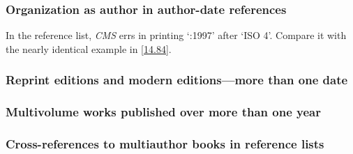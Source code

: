 \documentclass[11pt,letterpaper,oneside]{article}
\begin{document}
\begin{citeref}
\item \parencite{silverstein1974}
\item \parencite{soltes1999}
\end{citeref}

\subsubsection{Organization as author in author-date references}

In the reference list, \textit{CMS} errs in printing `:1997' after
`ISO 4'. Compare it with the nearly identical example in \ref{14.84}.

\begin{citeref}
\item \parencite{iso1997.ref}
\end{citeref}

\setcounter{subsubsection}{39}
\subsubsection{Reprint editions and modern editions—more than one date}

\begin{citeref}
\item \parencite{austen2003}
\item \parencite{maitland1998}
\end{citeref}

\subsubsection{Multivolume works published over more than one year}

\begin{citeref}
\item \parencite[1:133]{tillich1951}
\end{citeref}

\subsubsection{Cross-references to multiauthor books in reference lists}
\end{document}
